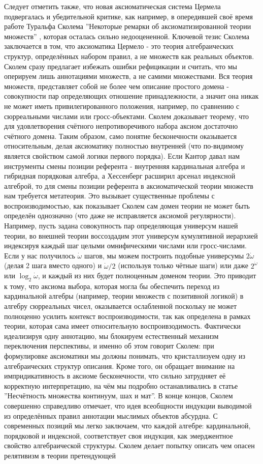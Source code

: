 \documentclass[12pt]{article}
\begin{document}
Следует отметить также, что новая аксиоматическая система Цермела подвергалась и убедительной критике, как например, в опередившей своё время работе Туральфа Сколема ''Некоторые ремарки об аксиоматизированной теории множеств'' \cite{skolem-axiomatization}, которая осталась сильно недооцененной. Ключевой тезис Сколема заключается в том, что аксиоматика Цермело - это теория алгебраических структур, определённых набором правил, а не множеств как реальных объектов. Сколем сразу предлагает избежать ошибки рефицикации и считать, что мы оперируем лишь аннотациями множеств, а не самими множествами. Вся теория множеств, представляет собой не более чем описание простого домена - совокупности пар определяющих отношение принадлежности, а значит она никак не может иметь привилегированного положения, например, по сравнению с сюрреальными числами или гросс-объектами. Сколем доказывает теорему, что для удовлетворения счётного непротиворечивого набора аксиом достаточно счётного домена. Таким образом, само понятие бесконечности оказывается относительным, делая аксиоматику полностью внутренней (что по-видимому является свойством самой логики первого порядка). Если Кантор давал нам инструменты смены позиции референта - внутренняя кардинальная алгебра и гибридная порядковая алгебра, а Хессенберг расширил арсенал индексной алгеброй, то для смены позиции референта в аксиоматической теории множеств нам требуется метатеория. Это вызывает существенные проблемы с воспроизводимостью, как показывает Сколем сам домен теории не может быть определён однозначно (что даже не исправляется аксиомой регулярности). Например, пусть задана совокупность пар определяющая универсум нашей теории, во внешней теории воссоздадим этот универсум кумулятивной иерархией индексируя каждый шаг целыми омнифическими числами или гросс-числами. Если у нас получилось $\dot{\omega}$ шагов, мы можем построить подобные универсумы $2\dot{\omega}$ (делая 2 шага вместо одного) и $\dot{\omega}/2$ (используя только чётные шаги) или даже $2^{\dot{\omega}}$ или $\log_2 \dot{\omega}$, и каждый из них будет полноценным доменом теории. Это приводит к тому, что аксиома выбора, которая могла бы обеспечить переход из кардинальной алгебры (например, теории множеств с позитивной логикой) в алгебру сюрреальных чисел, оказывается ослабленной поскольку не может полноценно усилить контекст воспроизводимости, так как определена в рамках теории, которая сама имеет относительную воспроивзодимость. Фактически идеализируя одну аннотацию, мы блокируем естественный механизм переключения перспективы, и именно об этом говорит Сколем: при формулировке аксиоматики мы должны понимать, что кристаллизуем одну из алгебраических структур описания. Кроме того, он обращает внимание на импридикативность в аксиоме бесконечности, что сильно затрудняет её корректную интерпретацию, на чём мы подробно останавливались в статье ''Несчётность множества континуум, шах и мат''. В конце концов, Сколем совершенно справедливо отмечает, что идея всеобщности индукции выводимой из определённых правил аннотации мыслимых объектов абсурдна. С современных позиций мы легко заключаем, что каждой алгебре: кардинальной, порядковой и индексной, соответствует своя индукция, как эмерджентное свойство алгебраической структуры. Сколем делает попытку описать чем опасен релятивизм в теории претендующей 
\end{document}
